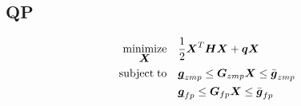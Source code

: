 
\subsection{QP}
\begin{equation*}
\begin{split}
    \minimize{\V{X}}    & \frac{1}{2} \V{X}^T\M{H}\V{X} + \V{q} \V{X}\\
    \subjectto          & \underbar{\V{g}}_{zmp}  \le  \M{G}_{zmp} \V{X}  \le  \bar{\V{g}}_{zmp}\\
                        & \underbar{\V{g}}_{fp}  \le  \M{G}_{fp} \V{X}  \le  \bar{\V{g}}_{fp}
\end{split}
\end{equation*}
